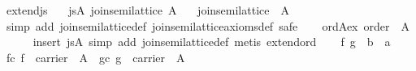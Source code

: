 \begin{isabellebody}
\isamarkupfalse%
%
\endisatagproof
{\isafoldproof}%
%
\isadelimproof
\isanewline
%
\endisadelimproof
\isanewline
{}\isamarkupfalse%
\ extend{}js{}\isanewline
\ \ \ js{}A{}\ {}join{}semilattice\ A{}\isanewline
\ \ \ {}join{}semilattice\ {}{}\ A{}{}\isanewline
%
\isadelimproof
%
\endisadelimproof
%
\isatagproof
{}\isamarkupfalse%
\ {}simp\ add{}\ join{}semilattice{}def\ join{}semilattice{}axioms{}def{}\ safe{}\isanewline
\ \ \isamarkupfalse%
\ ord{}A{}ex{}\ {}order\ {}{}\ A{}{}\isanewline
\ \ \ \ \isamarkupfalse%
\ {}insert\ js{}A{}\ simp\ add{}\ join{}semilattice{}def{}\ metis\ extend{}ord{}\isanewline
\isanewline
\ \ \isamarkupfalse%
\ f\ g\ {}{}\ {}{}b\ {}\ {}a{}\ \isamarkupfalse%
\ fc{}\ {}f\ {}\ carrier\ {}{}\ A{}{}\ \ gc{}\ {}g\ {}\ carrier\ {}{}\ A{}{}\isanewline

\end{isabellebody}
